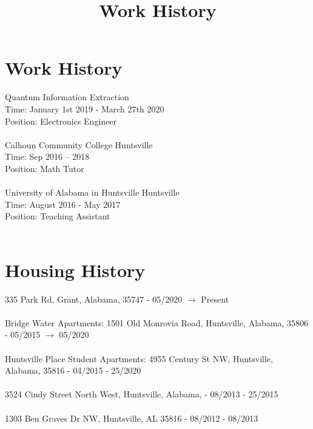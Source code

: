 \documentclass[]{article}
\title{Work History}
\begin{document}
\maketitle
\noindent
\section{Work History}
Quantum Information Extraction \\
Time: January 1st 2019 - March 27th 2020 \\ 
Position: Electronics Engineer \\ \\
Calhoun Community College Huntsville
\\
Time: Sep 2016 – 2018 \\
Position:  Math Tutor
\\ \\
University of Alabama in Huntsville Huntsville
\\
Time: August 2016 - May 2017 \\
Position: Teaching Assistant
 \\ \\
\section{Housing History}
335 Park Rd, Grant, Alabama, 35747 - 05/2020 $\to$ Present \\ \\
Bridge Water Apartments: 1501 Old Monrovia Road, Huntsville, Alabama, 35806 - 05/2015 $\to$ 05/2020 \\ \\
Huntsville Place Student Apartments: 4955 Century St NW, Huntsville, Alabama, 35816 - 04/2015 - 25/2020 \\ \\
3524 Cindy Street North West, Huntsville, Alabama,  - 08/2013 - 25/2015 \\\\
1303 Ben Graves Dr NW, Huntsville, AL 35816 - 08/2012 - 08/2013 \\\\
\end{document}
